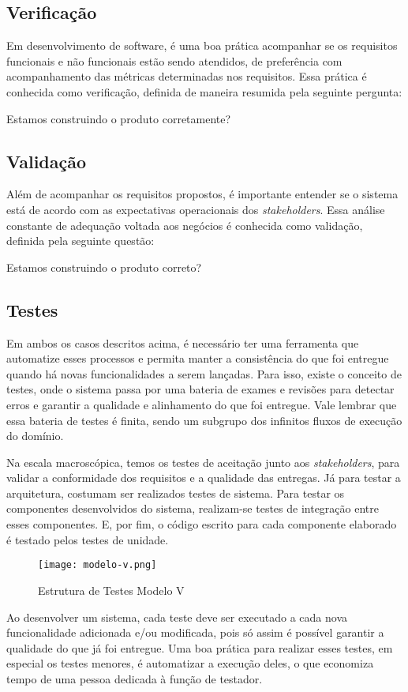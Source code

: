 \subsection{Verificação}
Em desenvolvimento de software, é uma boa prática acompanhar se os requisitos funcionais e não funcionais estão sendo atendidos, de preferência com acompanhamento das métricas determinadas nos requisitos. Essa prática é conhecida como verificação, definida de maneira resumida pela seguinte pergunta\cite{eduardofigueiredo2018}:

\begin{citacaoLonga}
Estamos construindo o produto corretamente?
\end{citacaoLonga}

\subsection{Validação}
Além de acompanhar os requisitos propostos, é importante entender se o sistema está de acordo com as expectativas operacionais dos \textit{stakeholders}. Essa análise constante de adequação voltada aos negócios é conhecida como validação, definida pela seguinte questão\cite{eduardofigueiredo2018}:

\begin{citacaoLonga}
Estamos construindo o produto correto?
\end{citacaoLonga}

\subsection{Testes}
Em ambos os casos descritos acima, é necessário ter uma ferramenta que automatize esses processos e permita manter a consistência do que foi entregue quando há novas funcionalidades a serem lançadas. Para isso, existe o conceito de testes, onde o sistema passa por uma bateria de exames e revisões para detectar erros e garantir a qualidade e alinhamento do que foi entregue. Vale lembrar que essa bateria de testes é finita, sendo um subgrupo dos infinitos fluxos de execução do domínio\cite{ieeecomputersociety2014}.

Na escala macroscópica, temos os testes de aceitação junto aos \textit{stakeholders}, para validar a conformidade dos requisitos e a qualidade das entregas. Já para testar a arquitetura, costumam ser realizados testes de sistema. Para testar os componentes desenvolvidos do sistema, realizam-se testes de integração entre esses componentes. E, por fim, o código escrito para cada componente elaborado é testado pelos testes de unidade.

\begin{figure}[H]
    \centering
    \texttt{[image: modelo-v.png]}
    \caption{Estrutura de Testes Modelo V\cite{devmedia2013}}
    \label{fig:modelo-v}
\end{figure}

Ao desenvolver um sistema, cada teste deve ser executado a cada nova funcionalidade adicionada e/ou modificada, pois só assim é possível garantir a qualidade do que já foi entregue. Uma boa prática para realizar esses testes, em especial os testes menores, é automatizar a execução deles, o que economiza tempo de uma pessoa dedicada à função de testador.
